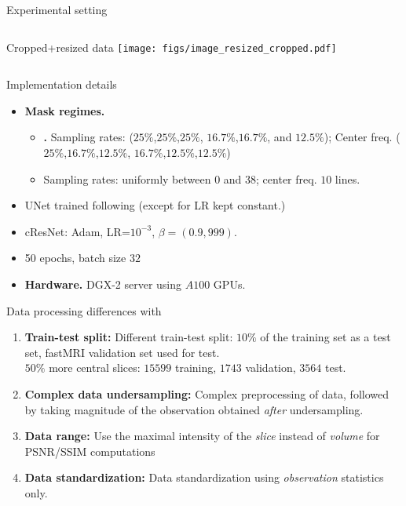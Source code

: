 \begin{frame}{Experimental setting}
\begin{columns}
    \vspace{.5cm}
    Cropped+resized data
    \texttt{[image: figs/image\_resized\_cropped.pdf]}
    \end{columns}
\end{frame}

\begin{frame}{Implementation details}
    \begin{itemize}
        \item \textbf{Mask regimes.}
        \begin{itemize}
            \item \textbf{\cite{bakker2020experimental}.} Sampling rates: ($25\%$,$25\%$,$25\%$, $16.7\%$,$16.7\%$, and $12.5\%$); Center freq. ($25\%$,$16.7\%$,$12.5\%$, $16.7\%$,$12.5\%$,$12.5\%$)
            \item \textbf{\cite{zhang2019reducing}} Sampling rates: uniformly between $0$ and $38$; center freq. $10$ lines.
        \end{itemize}
        \item UNet trained following \cite{zbontarFastMRIOpenDataset2019} (except for LR kept constant.)
        \item cResNet: Adam, LR=$10^{-3}$, $\beta=(0.9,999)$. 
        \item 50 epochs, batch size $32$
        \item \textbf{Hardware.} DGX-2 server using $A100$ GPUs.
    \end{itemize}
\end{frame}

\begin{frame}{Data processing differences with \cite{bakker2020experimental}}
    \begin{enumerate}
        \item \textbf{Train-test split:} Different train-test split: $10\%$ of the training set as a test set, fastMRI validation set used for test.\\
        $50\%$ more central slices: $15599$ training, $1743$ validation, $3564$ test.
        \item \textbf{Complex data undersampling:} Complex preprocessing of data, followed by taking magnitude of the observation obtained \textit{after} undersampling. 
        \item \textbf{Data range:} Use the maximal intensity of the \textit{slice} instead of \textit{volume} for PSNR/SSIM computations
        \item \textbf{Data standardization:} Data standardization using \textit{observation} statistics only.
    \end{enumerate}

\end{frame}

